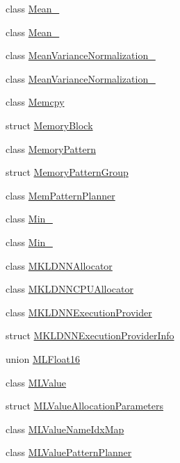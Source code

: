 \begin{DoxyCompactItemize}
class \mbox{\hyperlink{classonnxruntime_1_1Mean__6}{Mean\+\_}}
\item 
class \mbox{\hyperlink{classonnxruntime_1_1Mean__8}{Mean\+\_}}
\item 
class \mbox{\hyperlink{classonnxruntime_1_1MeanVarianceNormalization__0}{Mean\+Variance\+Normalization\+\_}}
\item 
class \mbox{\hyperlink{classonnxruntime_1_1MeanVarianceNormalization__1}{Mean\+Variance\+Normalization\+\_}}
\item 
class \mbox{\hyperlink{classonnxruntime_1_1Memcpy}{Memcpy}}
\item 
struct \mbox{\hyperlink{structonnxruntime_1_1MemoryBlock}{Memory\+Block}}
\item 
class \mbox{\hyperlink{classonnxruntime_1_1MemoryPattern}{Memory\+Pattern}}
\item 
struct \mbox{\hyperlink{structonnxruntime_1_1MemoryPatternGroup}{Memory\+Pattern\+Group}}
\item 
class \mbox{\hyperlink{classonnxruntime_1_1MemPatternPlanner}{Mem\+Pattern\+Planner}}
\item 
class \mbox{\hyperlink{classonnxruntime_1_1Min__6}{Min\+\_}}
\item 
class \mbox{\hyperlink{classonnxruntime_1_1Min__8}{Min\+\_}}
\item 
class \mbox{\hyperlink{classonnxruntime_1_1MKLDNNAllocator}{M\+K\+L\+D\+N\+N\+Allocator}}
\item 
class \mbox{\hyperlink{classonnxruntime_1_1MKLDNNCPUAllocator}{M\+K\+L\+D\+N\+N\+C\+P\+U\+Allocator}}
\item 
class \mbox{\hyperlink{classonnxruntime_1_1MKLDNNExecutionProvider}{M\+K\+L\+D\+N\+N\+Execution\+Provider}}
\item 
struct \mbox{\hyperlink{structonnxruntime_1_1MKLDNNExecutionProviderInfo}{M\+K\+L\+D\+N\+N\+Execution\+Provider\+Info}}
\item 
union \mbox{\hyperlink{uniononnxruntime_1_1MLFloat16}{M\+L\+Float16}}
\item 
class \mbox{\hyperlink{classonnxruntime_1_1MLValue}{M\+L\+Value}}
\item 
struct \mbox{\hyperlink{structonnxruntime_1_1MLValueAllocationParameters}{M\+L\+Value\+Allocation\+Parameters}}
\item 
class \mbox{\hyperlink{classonnxruntime_1_1MLValueNameIdxMap}{M\+L\+Value\+Name\+Idx\+Map}}
\item 
class \mbox{\hyperlink{classonnxruntime_1_1MLValuePatternPlanner}{M\+L\+Value\+Pattern\+Planner}}

\end{DoxyCompactItemize}
